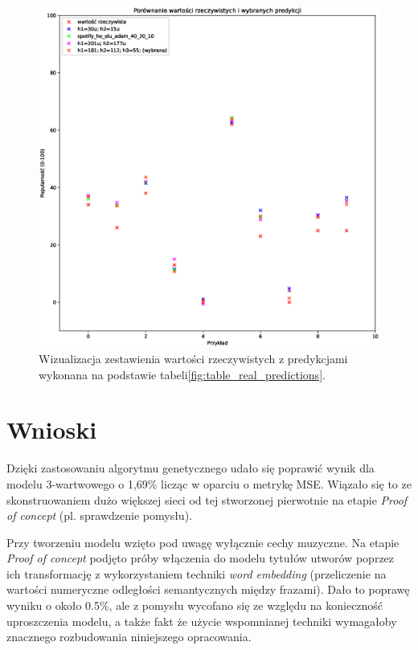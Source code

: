\documentclass[a4paper,11pt]{article}
\begin{document}
    \bigskip

    \begin{figure}[H]
        \label{fig:compr_samples_real_predictions}
        \centering
        \includegraphics[width=\textwidth]{compr_samples_real_predictions}
        \caption{Wizualizacja zestawienia wartości rzeczywistych z predykcjami wykonana na podstawie tabeli\ref{fig:table_real_predictions}.}
    \end{figure}

    \newpage


    \section{Wnioski}

    Dzięki zastosowaniu algorytmu genetycznego udało się poprawić wynik dla modelu 3-wartwowego o 1,69\% licząc w oparciu o metrykę MSE. Wiązało się to ze skonstruowaniem dużo większej sieci od tej stworzonej pierwotnie na etapie \textit{Proof of concept} (pl. sprawdzenie pomysłu).

    \bigskip

    Przy tworzeniu modelu wzięto pod uwagę wyłącznie cechy muzyczne. Na etapie \textit{Proof of concept} podjęto próby włączenia do modelu tytułów utworów poprzez ich transformację z wykorzystaniem techniki \textit{word embedding} (przeliczenie na wartości numeryczne odległości semantycznych między frazami). Dało to poprawę wyniku o około 0.5\%, ale z pomysłu wycofano się ze względu na konieczność uproszczenia modelu, a także fakt że użycie wspomnianej techniki wymagałoby znacznego rozbudowania niniejszego opracowania.
\end{document}
